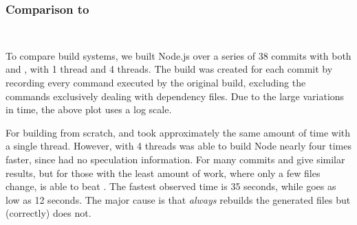 \subsubsection{Comparison to \Rattle} \verb" " %

\vspace{3mm}

To compare build systems, we built Node.js over a series of 38 commits with both \Make and \Rattle, with 1 thread and 4 threads. The \Rattle build was created for each commit by recording every command executed by the original build, excluding the commands exclusively dealing with dependency files. Due to the large variations in time, the above plot uses a log scale.

For building from scratch, \Make and \Rattle took approximately the same amount of time with a single thread. However, with 4 threads \Make was able to build Node nearly four times faster, since \Rattle had no speculation information. For many commits \Rattle and \Make give similar results, but for those with the least amount of work, where only a few files change, \Rattle is able to beat \Make. The fastest observed \Make time is 35 seconds, while \Rattle goes as low as 12 seconds. The major cause is that \Make \emph{always} rebuilds the generated files but \Rattle (correctly) does not.



